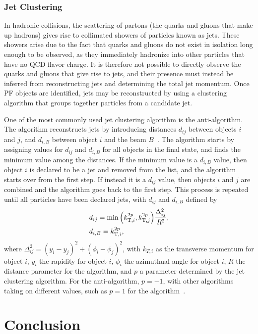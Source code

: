 \subsubsection{Jet Clustering}

In hadronic collisions, the scattering of partons (the quarks and gluons that make up hadrons) gives rise to collimated showers of particles known as jets.
These showers arise due to the fact that quarks and gluons do not exist in isolation long enough to be observed, as they immediately hadronize into other particles that have no QCD flavor charge.
It is therefore not possible to directly observe the quarks and gluons that give rise to jets, and their presence must instead be inferred from reconstructing jets and determining the total jet momentum.
Once PF objects are identified, jets may be reconstructed by using a clustering algorithm that groups together particles from a candidate jet.

One of the most commonly used jet clustering algorithm is the anti-\kt algorithm.
The algorithm reconstructs jets by introducing distances $d_{ij}$ between objects $i$ and $j$, and $d_{i,B}$ between object $i$ and the beam $B$~\cite{Cacciari_2008}.
The algorithm starts by assigning values for $d_{ij}$ and $d_{i,B}$ for all objects in the final state, and finds the minimum value among the distances.
If the minimum value is a $d_{i,B}$ value, then object $i$ is declared to be a jet and removed from the list, and the algorithm starts over from the first step.
If instead it is a $d_{ij}$ value, then objects $i$ and $j$ are combined and the algorithm goes back to the first step.
This process is repeated until all particles have been declared jets, with $d_{ij}$ and $d_{i,B}$ defined by
\begin{align}
  & d_{ij}=\min\pqty{k_{\mathrm{T},i}^{2p},k_{\mathrm{T},j}^{2p}}\frac{\Delta_{ij}^2}{R^2},\\
  & d_{i,B}=k_{\mathrm{T},i}^{2p},
\end{align}
where $\Delta_{ij}^2=(y_i-y_j)^2+(\phi_i-\phi_j)^2$, with $k_{T,i}$ as the transverse momentum for object $i$, $y_i$ the rapidity for object $i$, $\phi_i$ the azimuthual angle for object $i$, $R$ the distance parameter for the algorithm, and $p$ a parameter determined by the jet clustering algorithm.
For the anti-\kt algorithm, $p=-1$, with other algorithms taking on different values, such as $p=1$ for the \kt algorithm~\cite{Marzani_2019}.

\section{Conclusion}

